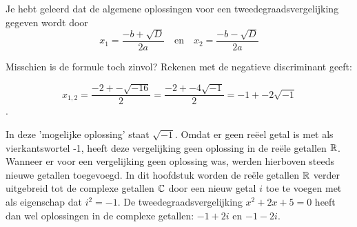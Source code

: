 \documentclass{ximera}
\begin{document}
\begin{image}     
\end{image}
    
    
    





Je hebt geleerd dat de algemene oplossingen voor een tweedegraadsvergelijking gegeven wordt door 
\[  
    x_{1} = \frac{-b + \sqrt{D}}{2a} \quad \text{en} \quad
    x_{2} = \frac{-b - \sqrt{D}}{2a}
\]

Misschien is de formule toch zinvol? Rekenen met de negatieve discriminant geeft:

\[ x_{1,2} = \frac{-2 +- \sqrt{-16}}{2} = \frac{-2 +- 4\sqrt{-1}}{2} = -1 +- 2\sqrt{-1}\]. 

In deze 'mogelijke oplossing' staat \(\sqrt{-1}\). Omdat er geen reëel getal is met als vierkantswortel -1, heeft deze vergelijking geen oplossing in de reële getallen \(\mathbb{R}\). Wanneer er voor een vergelijking geen oplossing was, werden hierboven steeds nieuwe getallen toegevoegd. In dit hoofdstuk worden de reële getallen \(\mathbb{R}\) verder uitgebreid tot de complexe getallen \(\mathbb{C}\) door een nieuw getal \(i\) toe te voegen met als eigenschap dat \(i^2 = -1\). De tweedegraadsvergelijking \(x^2 + 2x + 5 = 0\) heeft dan wel oplossingen in de complexe getallen: \(-1 + 2i\)  en  \(-1-2i\).

\end{document}
